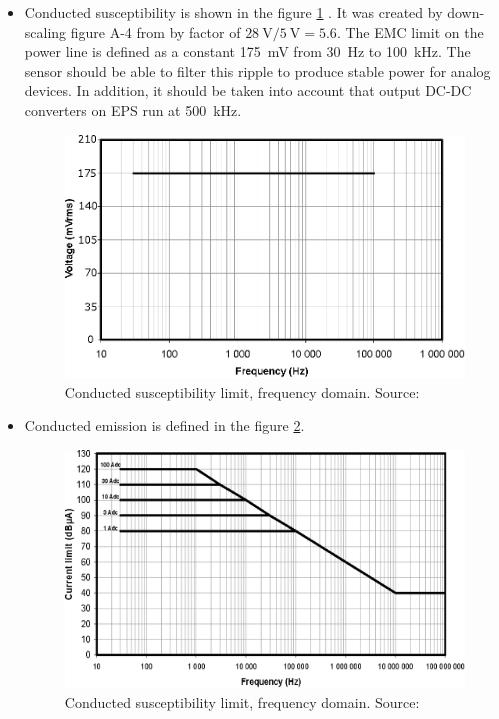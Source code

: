         \begin{itemize}
            \item Conducted susceptibility is shown in the figure \ref{EMC_conducted_susceptibility} . It was created by down-scaling figure A-4 from \cite{ECSS_E_ST_20_07C} by factor of $\SI{28}{\volt}/\SI{5}{\volt} = 5.6$. The EMC limit on the power line is defined as a constant \SI{175}{\milli\volt} from \SI{30}{\hertz} to \SI{100}{\kilo\hertz}. The sensor should be able to filter this ripple to produce stable power for analog devices. In addition, it should be taken into account that output DC-DC converters on EPS run at \SI{500}{\kilo\hertz}.

            \begin{figure}[H]
                \centering
                \includegraphics[width=0.5\paperwidth]{img/EMC_conducted_susceptibility.eps}
                \caption{Conducted susceptibility limit, frequency domain. Source: \cite{ECSS_E_ST_20_07C}}
                \label{EMC_conducted_susceptibility}
            \end{figure}


            \item Conducted emission is defined in the figure \ref{EMC_conducted_emission}.

            \begin{figure}[H]
                \centering
                \includegraphics[width=0.5\paperwidth]{img/EMC_conducted_emission.eps}
                \caption{Conducted susceptibility limit, frequency domain. Source: \cite{ECSS_E_ST_20_07C}}
                \label{EMC_conducted_emission}
            \end{figure}



\end{itemize}
